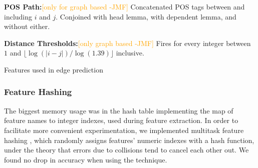 \documentclass[11pt]{article}
\newcommand{\bocomment}[1]{\textcolor{Bittersweet}{[#1 -BTO]}}
\newcommand{\sam}[1]{\textcolor{blue}{[#1 -SMT]}}
\newcommand{\jmf}[1]{\textcolor{orange}{[#1 -JMF]}}
\newcommand{\codenote}[1]{}
\begin{document}
\begin{table}
\begin{framed}
\begin{small}
\textbf{POS Path:}\jmf{only for graph based} Concatenated POS tags between
    and including $i$ and $j$.  Conjoined with head lemma, with dependent
    lemma, and without either.


\textbf{Distance Thresholds:}\jmf{only graph based} Fires for every integer between
    $1$ and $\lfloor \log(|i-j|)/\log(1.39) \rfloor$ inclusive.


\end{small}
\end{framed}
\caption{Features used in edge prediction}
\label{table:edgefeatures}
\end{table}


\subsubsection{Feature Hashing}

  The biggest memory usage was in the hash table implementing the map
  of feature names to integer indexes, used during feature extraction.
  In order to facilitate more convenient experimentation, we
  implemented multitask feature hashing
  \cite{weinberger_feature_2009}, which randomly assigns features'
  numeric indexes with a hash function, under the theory that errors
  due to collisions tend to cancel each other out.  We found no
  drop in accuracy when using the technique.


\end{document}
